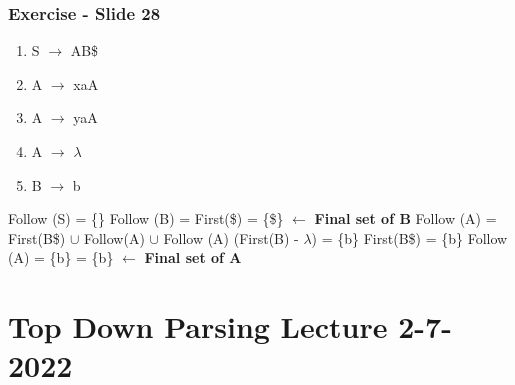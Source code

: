\documentclass{report}
\begin{document}
\subsection{Exercise - Slide 28}
\vspace{-1.5em}
\begin{multicols}{2}
  \begin{enumerate}
    \setlength\itemsep{-.25em}
    \item S $\rightarrow$ AB\$
    \item A $\rightarrow$ xaA
    \item A $\rightarrow$ yaA
    \item A $\rightarrow$ $\lambda$
    \item B $\rightarrow$ b\newline
  \end{enumerate}
  \setlength{\leftskip}{-12em}
Follow (S) = \{\}\newline
Follow (B) = First(\$) = \{\$\}  $\leftarrow$ \textbf{Final set of B}\newline
Follow (A) = First(B\$) $\cup$ Follow(A) $\cup$ Follow (A)\newline
\indent\hspace{.25cm}(First(B) - $\lambda$) = \{b\}\newline
\indent\hspace{.25cm}First(B\$) = \{b\}\newline
Follow (A) = \{b\} = \{b\} $\leftarrow$ \textbf{Final set of A}\newline
\end{multicols}

\newpage

\chapter{Top Down Parsing Lecture 2-7-2022}
\end{document}
